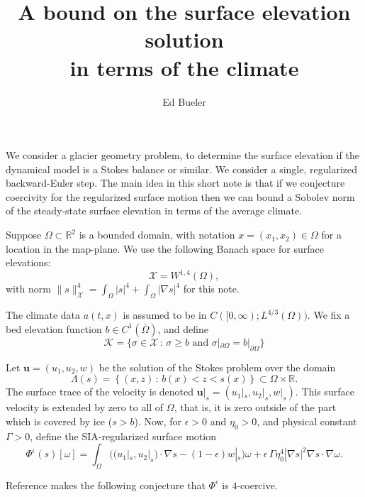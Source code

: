 \documentclass[12pt]{article}
\title{A bound on the surface elevation solution \\ in terms of the climate}
\author{Ed Bueler}
\newcommand{\RR}{\ensuremath{\mathbb R}}
\newcommand{\bu}{\ensuremath{\mathbf{u}}}
\newcommand{\cK}{\ensuremath{\mathcal{K}}}
\newcommand{\cX}{\ensuremath{\mathcal{X}}}
\newcommand{\grad}{\ensuremath{\nabla}}
\newcommand{\eps}{\ensuremath{\epsilon}}
\begin{document}
\maketitle

We consider a glacier geometry problem, to determine the surface elevation if the dynamical model is a Stokes balance or similar.  We consider a single, regularized backward-Euler step.  The main idea in this short note is that if we conjecture coercivity for the regularized surface motion then we can bound a Sobolev norm of the steady-state surface elevation in terms of the average climate.

Suppose $\Omega\subset \RR^2$ is a bounded domain, with notation $x=(x_1,x_2)\in\Omega$ for a location in the map-plane.  We use the following Banach space for surface elevations:
\begin{equation}
\cX = W^{1,4}(\Omega), \label{eq:defineX}
\end{equation}
with norm $\|s\|_{\cX}^4 = \int_\Omega |s|^4 + \int_\Omega |\grad s|^4$ for this note.

The climate data $a(t,x)$ is assumed to be in $C([0,\infty); L^{4/3}(\Omega))$.  We fix a bed elevation function $b\in C^1(\bar\Omega)$, and define
\begin{equation}
\cK=\{\sigma\in\cX\,:\,\sigma\ge b \text{ and } \sigma|_{\partial\Omega}=b|_{\partial\Omega}\} \label{eq:defineK}
\end{equation}

Let $\bu=(u_1,u_2,w)$ be the solution of the Stokes problem over the domain
\begin{equation}
\Lambda(s) = \left\{(x,z)\,:\,b(x) < z < s(x)\right\} \subset \Omega \times \RR. \label{eq:domainfroms}
\end{equation}
The surface trace of the velocity is denoted $\bu|_s=(u_1|_s,u_2|_s,w|_s)$.  This surface velocity is extended by zero to all of $\Omega$, that is, it is zero outside of the part which is covered by ice ($s>b$).  Now, for $\eps>0$ and $\eta_0>0$, and physical constant $\Gamma>0$, define the SIA-regularized surface motion
\begin{equation}
\Phi^\eps(s)[\omega] = \int_\Omega \Big(\big(u_1|_s,u_2|_s\big) \cdot \grad s - (1-\eps) w|_s\Big) \omega + \eps\, \Gamma \eta_0^4 |\grad s|^2 \grad s \cdot \grad \omega. \label{eq:defineregularizedPhi}
\end{equation}

Reference \cite{Bueler2025} makes the following conjecture that $\Phi^\eps$ is $4$-coercive.
\end{document}
